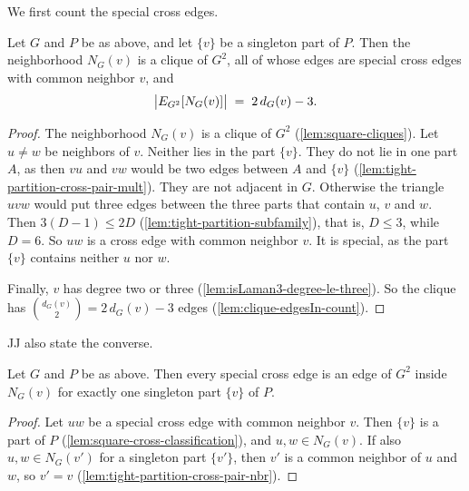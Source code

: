 We first count the special cross edges.

\begin{lemma}
  \label{lem:singleton-part-neighborhood}
  \leanok
  Let $G$ and $P$ be as above, and let $\{v\}$ be a singleton part of
  $P$. Then the neighborhood $N_G(v)$ is a clique of $G^2$, all of whose
  edges are special cross edges with common neighbor $v$, and
  \[
    \bigl|\edgesIn[G^2]{N_G(v)}\bigr| \;=\; 2\,d_G(v) - 3 .
  \]
\end{lemma}
\begin{proof}
  \leanok
  The neighborhood $N_G(v)$ is a clique of $G^2$
  (\cref{lem:square-cliques}). Let $u \ne w$ be neighbors of $v$.
  Neither lies in the part $\{v\}$. They do not lie in one part $A$, as
  then $vu$ and $vw$ would be two edges between $A$ and $\{v\}$
  (\cref{lem:tight-partition-cross-pair-mult}). They are not adjacent in
  $G$. Otherwise the triangle $uvw$ would put three edges between the
  three parts that contain $u$, $v$ and $w$. Then $3(D - 1) \le 2D$
  (\cref{lem:tight-partition-subfamily}), that is, $D \le 3$, while
  $D = 6$. So $uw$ is a cross edge with common neighbor $v$. It is
  special, as the part $\{v\}$ contains neither $u$ nor $w$.

  Finally, $v$ has degree two or three
  (\cref{lem:isLaman3-degree-le-three}). So the clique has
  $\binom{d_G(v)}{2} = 2\,d_G(v) - 3$ edges
  (\cref{lem:clique-edgesIn-count}).
\end{proof}

JJ also state the converse.

\begin{lemma}
  \label{lem:singleton-part-converse}
  \leanok
  Let $G$ and $P$ be as above. Then every special cross edge is an edge
  of $G^2$ inside $N_G(v)$ for exactly one singleton part $\{v\}$ of
  $P$.
\end{lemma}
\begin{proof}
  \leanok
  Let $uw$ be a special cross edge with common neighbor $v$. Then
  $\{v\}$ is a part of $P$ (\cref{lem:square-cross-classification}), and
  $u, w \in N_G(v)$. If also $u, w \in N_G(v')$ for a singleton part
  $\{v'\}$, then $v'$ is a common neighbor of $u$ and $w$, so $v' = v$
  (\cref{lem:tight-partition-cross-pair-nbr}).
\end{proof}

